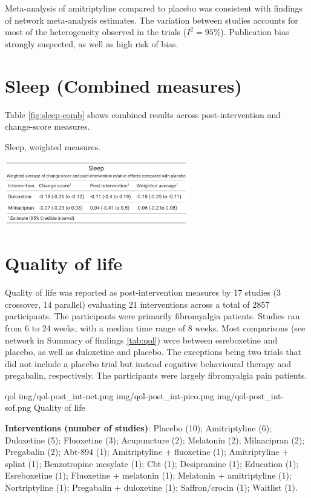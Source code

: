 \documentclass{report}\usepackage[]{graphicx}\usepackage[]{color}
\begin{document}
Meta-analysis of amitriptyline compared to placebo was consistent with findings of network meta-analysis estimates. The variation between studies accounts for most of the heterogeneity observed in the trials ($I^2 = 95$\%). Publication bias strongly suspected, as well as high risk of bias.

\section{Sleep (Combined measures)}

Table \ref{fig:sleep-comb} shows combined results across post-intervention and change-score measures.

\begin{table}
\centering
\caption{Sleep, weighted measures.}
\label{fig:sleep-comb}
\includegraphics[width=0.6\textwidth]{img/sleep-combined.png}
\end{table}

\section{Quality of life}

Quality of life was reported as post-intervention measures by 17 studies (3 crossover, 14 parallel) evaluating 21 interventions across a total of 2857 participants. The participants were primarily fibromyalgia patients. Studies ran from 6 to 24 weeks, with a median time range of 8 weeks. Most comparisons (see network in Summary of findings \ref{tab:qol}) were between esreboxetine and placebo, as well as duloxetine and placebo. The exceptions being two trials that did not include a placebo trial but instead cognitive behavioural therapy and pregabalin, respectively. The participants were largely fibromyalgia pain patients.


\soffignew
{qol}
{img/qol-post_int-net.png}
{img/qol-post_int-pico.png}
{img/qol-post_int-sof.png}
{Quality of life}

\textbf{Interventions (number of studies)}: Placebo (10); Amitriptyline (6); Duloxetine (5); Fluoxetine (3); Acupuncture (2); Melatonin (2); Milnacipran (2); Pregabalin (2); Abt-894 (1); Amitriptyline + fluoxetine (1); Amitriptyline + splint (1); Benzotropine mesylate (1); Cbt (1); Desipramine (1); Education (1); Esreboxetine (1); Fluoxetine + melatonin (1); Melatonin + amitriptyline (1); Nortriptyline (1); Pregabalin + duloxetine (1); Saffron/crocin (1); Waitlist (1).
\end{document}
